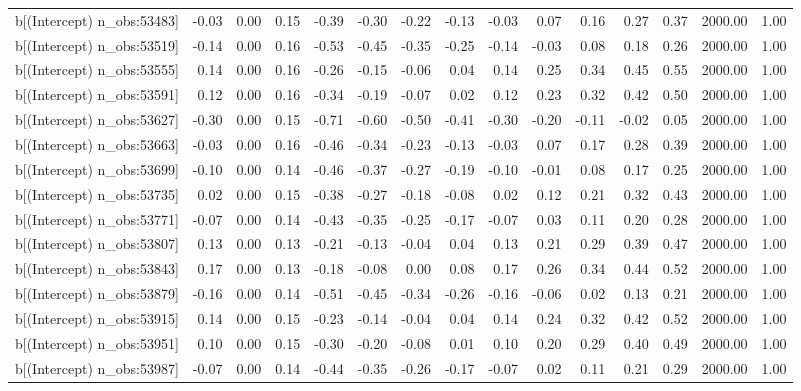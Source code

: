 \begin{table}[ht]
\begin{tabular}{rrrrrrrrrrrrrrr}
  b[(Intercept) n\_obs:53483] & -0.03 & 0.00 & 0.15 & -0.39 & -0.30 & -0.22 & -0.13 & -0.03 & 0.07 & 0.16 & 0.27 & 0.37 & 2000.00 & 1.00 \\ 
  b[(Intercept) n\_obs:53519] & -0.14 & 0.00 & 0.16 & -0.53 & -0.45 & -0.35 & -0.25 & -0.14 & -0.03 & 0.08 & 0.18 & 0.26 & 2000.00 & 1.00 \\ 
  b[(Intercept) n\_obs:53555] & 0.14 & 0.00 & 0.16 & -0.26 & -0.15 & -0.06 & 0.04 & 0.14 & 0.25 & 0.34 & 0.45 & 0.55 & 2000.00 & 1.00 \\ 
  b[(Intercept) n\_obs:53591] & 0.12 & 0.00 & 0.16 & -0.34 & -0.19 & -0.07 & 0.02 & 0.12 & 0.23 & 0.32 & 0.42 & 0.50 & 2000.00 & 1.00 \\ 
  b[(Intercept) n\_obs:53627] & -0.30 & 0.00 & 0.15 & -0.71 & -0.60 & -0.50 & -0.41 & -0.30 & -0.20 & -0.11 & -0.02 & 0.05 & 2000.00 & 1.00 \\ 
  b[(Intercept) n\_obs:53663] & -0.03 & 0.00 & 0.16 & -0.46 & -0.34 & -0.23 & -0.13 & -0.03 & 0.07 & 0.17 & 0.28 & 0.39 & 2000.00 & 1.00 \\ 
  b[(Intercept) n\_obs:53699] & -0.10 & 0.00 & 0.14 & -0.46 & -0.37 & -0.27 & -0.19 & -0.10 & -0.01 & 0.08 & 0.17 & 0.25 & 2000.00 & 1.00 \\ 
  b[(Intercept) n\_obs:53735] & 0.02 & 0.00 & 0.15 & -0.38 & -0.27 & -0.18 & -0.08 & 0.02 & 0.12 & 0.21 & 0.32 & 0.43 & 2000.00 & 1.00 \\ 
  b[(Intercept) n\_obs:53771] & -0.07 & 0.00 & 0.14 & -0.43 & -0.35 & -0.25 & -0.17 & -0.07 & 0.03 & 0.11 & 0.20 & 0.28 & 2000.00 & 1.00 \\ 
  b[(Intercept) n\_obs:53807] & 0.13 & 0.00 & 0.13 & -0.21 & -0.13 & -0.04 & 0.04 & 0.13 & 0.21 & 0.29 & 0.39 & 0.47 & 2000.00 & 1.00 \\ 
  b[(Intercept) n\_obs:53843] & 0.17 & 0.00 & 0.13 & -0.18 & -0.08 & 0.00 & 0.08 & 0.17 & 0.26 & 0.34 & 0.44 & 0.52 & 2000.00 & 1.00 \\ 
  b[(Intercept) n\_obs:53879] & -0.16 & 0.00 & 0.14 & -0.51 & -0.45 & -0.34 & -0.26 & -0.16 & -0.06 & 0.02 & 0.13 & 0.21 & 2000.00 & 1.00 \\ 
  b[(Intercept) n\_obs:53915] & 0.14 & 0.00 & 0.15 & -0.23 & -0.14 & -0.04 & 0.04 & 0.14 & 0.24 & 0.32 & 0.42 & 0.52 & 2000.00 & 1.00 \\ 
  b[(Intercept) n\_obs:53951] & 0.10 & 0.00 & 0.15 & -0.30 & -0.20 & -0.08 & 0.01 & 0.10 & 0.20 & 0.29 & 0.40 & 0.49 & 2000.00 & 1.00 \\ 
  b[(Intercept) n\_obs:53987] & -0.07 & 0.00 & 0.14 & -0.44 & -0.35 & -0.26 & -0.17 & -0.07 & 0.02 & 0.11 & 0.21 & 0.29 & 2000.00 & 1.00 \\ 

\end{tabular}
\end{table}
